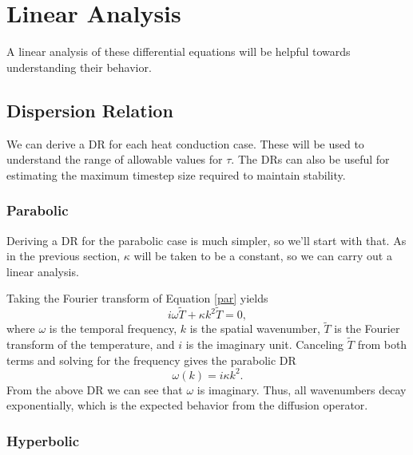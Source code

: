 \documentclass[iop]{emulateapj}
\begin{document}
	\section{Linear Analysis}
	
			A linear analysis of these differential equations will be helpful towards understanding their behavior.
	
		\subsection{Dispersion Relation}
		
				We can derive a \ac{DR} for each heat conduction case.
					These will be used to understand the range of allowable values for $\tau$.
					The \ac{DR}s can also be useful for estimating the maximum timestep size required to maintain stability.
					
			\subsubsection{Parabolic}
			
				Deriving a \ac{DR} for the parabolic case is much simpler, so we'll start with that.
					As in the previous section, $\kappa$ will be taken to be a constant, so we can carry out a linear analysis.
					
				Taking the Fourier transform of Equation \ref{par} yields
				\begin{equation}
					i \omega \tilde{T} + \kappa k^2 \tilde{T} = 0,
				\end{equation}
				where $\omega$ is the temporal frequency, $k$ is the spatial wavenumber, $\tilde{T}$ is the Fourier transform of the temperature, and $i$ is the imaginary unit.
				Canceling $\tilde{T}$ from both terms and solving for the frequency gives the parabolic \ac{DR}
				\begin{equation}
					\omega(k) = i \kappa k^2.
				\end{equation}
				From the above \ac{DR} we can see that $\omega$ is imaginary. Thus, all wavenumbers decay exponentially, which is the expected behavior from the diffusion operator.
						
			\subsubsection{Hyperbolic}
			
\end{document}
